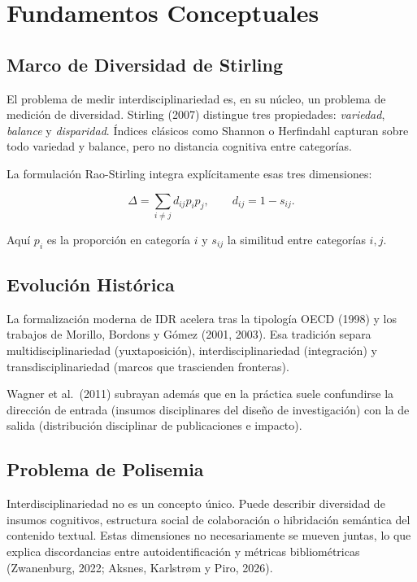 \documentclass[
]{article}
\begin{document}
\hypertarget{fundamentos-conceptuales}{%
\section{Fundamentos Conceptuales}\label{fundamentos-conceptuales}}

\hypertarget{marco-de-diversidad-de-stirling}{%
\subsection{Marco de Diversidad de
Stirling}\label{marco-de-diversidad-de-stirling}}

El problema de medir interdisciplinariedad es, en su núcleo, un problema
de medición de diversidad. Stirling (2007) distingue tres propiedades:
\emph{variedad}, \emph{balance} y \emph{disparidad}. Índices clásicos
como Shannon o Herfindahl capturan sobre todo variedad y balance, pero
no distancia cognitiva entre categorías.

La formulación Rao-Stirling integra explícitamente esas tres
dimensiones:

\[\Delta = \sum_{i \neq j} d_{ij} p_i p_j, \qquad d_{ij}=1-s_{ij}.\]

Aquí \(p_i\) es la proporción en categoría \(i\) y \(s_{ij}\) la
similitud entre categorías \(i,j\).

\hypertarget{evoluciuxf3n-histuxf3rica}{%
\subsection{Evolución Histórica}\label{evoluciuxf3n-histuxf3rica}}

La formalización moderna de IDR acelera tras la tipología OECD (1998) y
los trabajos de Morillo, Bordons y Gómez (2001, 2003). Esa tradición
separa multidisciplinariedad (yuxtaposición), interdisciplinariedad
(integración) y transdisciplinariedad (marcos que trascienden
fronteras).

Wagner et al.~(2011) subrayan además que en la práctica suele
confundirse la dirección de entrada (insumos disciplinares del diseño de
investigación) con la de salida (distribución disciplinar de
publicaciones e impacto).

\hypertarget{problema-de-polisemia}{%
\subsection{Problema de Polisemia}\label{problema-de-polisemia}}

Interdisciplinariedad no es un concepto único. Puede describir
diversidad de insumos cognitivos, estructura social de colaboración o
hibridación semántica del contenido textual. Estas dimensiones no
necesariamente se mueven juntas, lo que explica discordancias entre
autoidentificación y métricas bibliométricas (Zwanenburg, 2022; Aksnes,
Karlstrøm y Piro, 2026).
\end{document}

